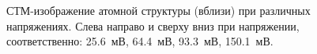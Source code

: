 \documentclass[a4paper, 12pt]{article}
\begin{document}
\begin{figure}[H]
	\centering
	
	\caption{СТМ-изображение атомной структуры (вблизи) при различных напряжениях. Слева направо и сверху вниз при напряжении, соответственно: 25.6~мВ, 64.4~мВ, 93.3~мВ, 150.1~мВ.}
	\label{fig:2_different_volt}
\end{figure}
\end{document}
